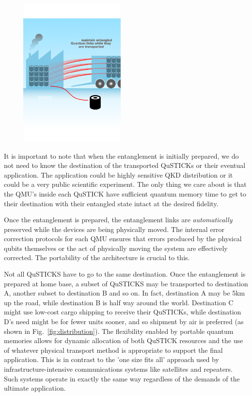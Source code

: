 \documentclass[twocolumn, aps, rmp, amsmath, amssymb, nofootinbib, superscriptaddress, longbibliography, floatfix, table-of-contents, eqsecnum]{revtex4-2}
\begin{document}
\begin{figure}[htbp!]
	\includegraphics[clip=true, width=0.475\textwidth]{qustick2}
	\caption{} \label{fig:loading}
\end{figure}

It is important to note that when the entanglement is initially prepared, we do not need to know the destination of the transported QuSTICKs or their eventual application. The application could be highly sensitive QKD distribution or it could be a very public scientific experiment. The only thing we care about is that the QMU's inside each QuSTICK have sufficient quantum memory time to get to their destination with their entangled state intact at the desired fidelity.

Once the entanglement is prepared, the entanglement links are \textit{automatically} preserved while the devices are being physically moved. The internal error correction protocols for each QMU ensures that errors produced by the physical qubits themselves or the act of physically moving the system are effectively corrected. The portability of the architecture is crucial to this. 

Not all QuSTICKS have to go to the same destination. Once the entanglement is prepared at home base, a subset of QuSTICKS may be transported to destination A, another subset to destination B and so on. In fact, destination A may be 5km up the road, while destination B is half way around the world. Destination C might use low-cost cargo shipping to receive their QuSTICKs, while destination D's need might be for fewer units sooner, and so shipment by air is preferred (as shown in Fig.~\ref{fig:distribution}). The flexibility enabled by portable quantum memories allows for dynamic allocation of both QuSTICK resources and the use of whatever physical transport method is appropriate to support the final application. This is in contrast to the 'one size fits all' approach used by infrastructure-intensive communications systems like satellites and repeaters. Such systems operate in exactly the same way regardless of the demands of the ultimate application.
\end{document}
